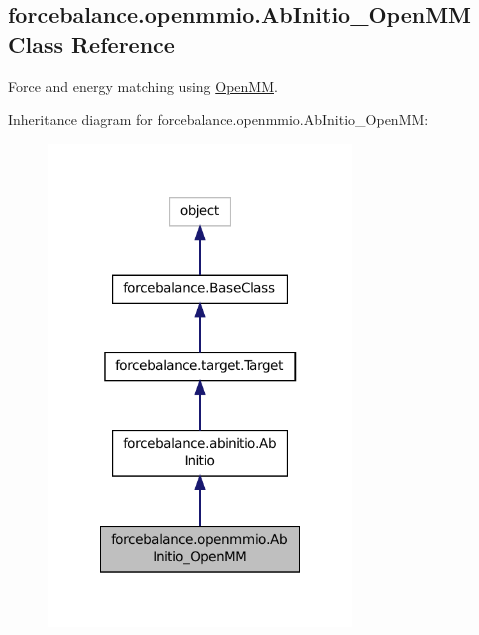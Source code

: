 \hypertarget{classforcebalance_1_1openmmio_1_1AbInitio__OpenMM}{\subsection{forcebalance.\-openmmio.\-Ab\-Initio\-\_\-\-Open\-M\-M Class Reference}
\label{classforcebalance_1_1openmmio_1_1AbInitio__OpenMM}
}


Force and energy matching using \hyperlink{classforcebalance_1_1openmmio_1_1OpenMM}{Open\-M\-M}.  




Inheritance diagram for forcebalance.\-openmmio.\-Ab\-Initio\-\_\-\-Open\-M\-M\-:
\nopagebreak
\begin{figure}[H]
\begin{center}
\leavevmode
\includegraphics[width=228pt]{classforcebalance_1_1openmmio_1_1AbInitio__OpenMM__inherit__graph}
\end{center}
\end{figure}


